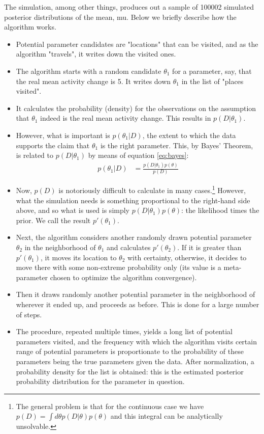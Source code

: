 \documentclass[10pt,]{scrartcl}
\begin{document}
\normalsize

The simulation, among other things, produces out a sample of 100002
simulated posterior distributions of the mean, \textsf{mu}. Below we
briefly describe how the algorithm works.\\

\begin{itemize}
\item Potential parameter  candidates are "locations"  that can be visited, and as the algorithm "travels", it writes down the  visited ones.
\item The algorithm starts with a random candidate $\theta_1$ for a parameter, say, that the real mean activity change is 5. It writes down $\theta_1$ in the list of "places visited".
\item It calculates the probability (density) for the observations  on the assumption that $\theta_1$ indeed is the real mean activity change. This results in $p(D\vert \theta_1)$.
\item  However, what is important is $p(\theta_1\vert D)$, the extent to which the data supports the claim that $\theta_1$ is the right parameter. This, by Bayes' Theorem, is related to $p(D\vert \theta_1)$ by means of equation \eqref{eq:bayes}:
\begin{align}\label{eq:bayes}
p(\theta_1\vert D) & = \frac{p(D\vert \theta_1)p(\theta)}{p(D)}
\end{align}
\item Now, $p(D)$ is notoriously difficult to calculate in many cases.\footnote{The general problem is that  for the continuous case we have $p(D) = \int d \theta p(D\vert \theta) p (\theta)$ and this integral can be analytically unsolvable.}
However,  what the simulation needs is something proportional to the right-hand side above, and so what is used is simply $p(D\vert \theta_1)p(\theta)$: the likelihood times the prior. We call the result $p'(\theta_1)$.
\item Next, the algorithm considers another randomly drawn potential parameter $\theta_2$ in the neighborhood of $\theta_1$ and calculates $p'(\theta_2)$. If it is greater than $p'(\theta_1)$, it moves its location to $\theta_2$ with certainty, otherwise, it decides to move there with some non-extreme probability only (its value is a meta-parameter chosen to optimize the algorithm convergence).
\item Then it draws randomly another potential parameter in the neighborhood of wherever it ended up, and proceeds as before. This is done for a large number of steps. 
\item The procedure, repeated multiple  times, yields a long list of potential parameters visited, and the frequency with which the algorithm visits certain range of potential parameters is proportionate to the probability of these parameters being the true parameters given the data. After normalization,  a probability density for the list is obtained: this is the estimated posterior probability distribution  for the parameter in question.
\end{itemize}
\end{document}
